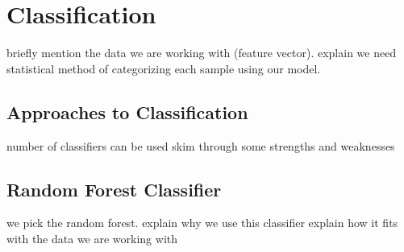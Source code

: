 \section{Classification}
briefly mention the data we are working with (feature vector).
explain we need statistical method of categorizing each sample using our
model.

\subsection{Approaches to Classification}
number of classifiers can be used
skim through some strengths and weaknesses

\subsection{Random Forest Classifier}
we pick the random forest.
explain why we use this classifier
explain how it fits with the data we are working with
